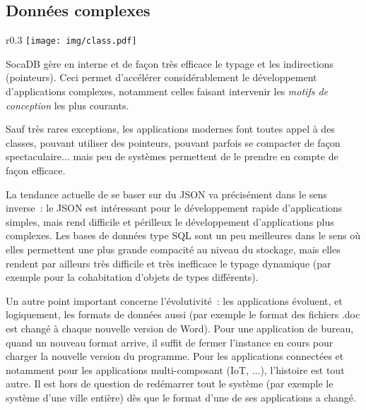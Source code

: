 \documentclass[a4paper,10pt]{scrreprt}
\begin{document}
        \subsection{Données complexes}

            \begin{wrapfigure}{r}{0.3\textwidth}
                \hfill
                \vspace{-0.9em}
                \texttt{[image: img/class.pdf]}
                \begin{center}
                \begin{scriptsize}
                    SocaDB gère en interne et de façon très efficace le typage et les indirections (pointeurs). Ceci permet d'accélérer considérablement le développement d'applications complexes, notamment celles faisant intervenir les \textit{motifs de conception} les plus courants.
                \end{scriptsize}
                \end{center}
            \end{wrapfigure}
        
            Sauf très rares exceptions, les applications modernes font toutes appel à des classes, pouvant utiliser des pointeurs, pouvant parfois se compacter de façon spectaculaire... mais peu de systèmes permettent de le prendre en compte de façon efficace.
            
            La tendance actuelle de se baser sur du JSON va précisément dans le sens inverse~: le JSON est intéressant pour le développement rapide d'applications simples, mais rend difficile et périlleux le développement d'applications plus complexes. Les bases de données type SQL sont un peu meilleures dans le sens où elles permettent une plus grande compacité au niveau du stockage, mais elles rendent par ailleurs très difficile et très inefficace le typage dynamique (par exemple pour la cohabitation d'objets de types différents).

            \medskip
            Un autre point important concerne l'évolutivité~: les applications évoluent, et logiquement, les formats de données aussi (par exemple le format des fichiers .doc est changé à chaque nouvelle version de Word). Pour une application de bureau, quand un nouveau format arrive, il suffit de fermer l'instance en cours pour charger la nouvelle version du programme. Pour les applications connectées et notamment pour les applications multi-composant (IoT, ...), l'histoire est tout autre. Il est hors de question de redémarrer tout le système (par exemple le système d'une ville entière) dès que le format d'une de ses applications a changé.
            
\end{document}

